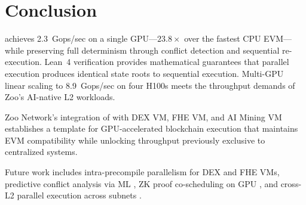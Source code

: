 \section{Conclusion}

\label{sec:conclusion}

\cevm{} achieves 2.3~Gops/sec on a single GPU---$23.8\times$ over the fastest CPU EVM---while preserving full determinism through conflict detection and sequential re-execution.
Lean~4 verification provides mathematical guarantees that parallel execution produces identical state roots to sequential execution.
Multi-GPU linear scaling to 8.9~Gops/sec on four H100s meets the throughput demands of Zoo's AI-native L2 workloads.

Zoo Network's integration of \cevm{} with DEX VM, FHE VM, and AI Mining VM establishes a template for GPU-accelerated blockchain execution that maintains EVM compatibility while unlocking throughput previously exclusive to centralized systems.

Future work includes intra-precompile parallelism for DEX and FHE VMs, predictive conflict analysis via ML \cite{zoo-tokenomics}, ZK proof co-scheduling on GPU \cite{zoo-fhe}, and cross-L2 parallel execution across \Lux{} subnets \cite{zoo-dex}.

